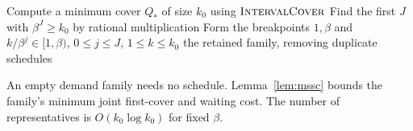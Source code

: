 \begin{algorithm}[H]
\caption{\BatchOrders: deterministic family of geometric-batch schedules}
\label{alg:batch-orders}
Compute a minimum cover $Q_*$ of size $k_0$ using $\textnormal{\textsc{IntervalCover}}$\;
Find the first $J$ with $\beta^J\ge k_0$ by rational multiplication\;
Form the breakpoints $1,\beta$ and $k/\beta^j\in[1,\beta)$,
$0\le j\le J$, $1\le k\le k_0$\;
\KwRet the retained family, removing duplicate schedules\;
\end{algorithm}

An empty demand family needs no schedule. Lemma~\ref{lem:mssc}
bounds the family's minimum joint first-cover and waiting cost.
The number of representatives is $O(k_0\log k_0)$ for fixed $\beta$.
